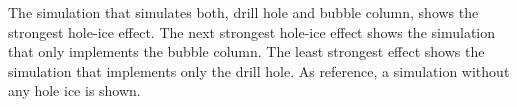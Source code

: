 The simulation that simulates both, drill hole and bubble column, shows the strongest hole-ice effect. The next strongest hole-ice effect shows the simulation that only implements the bubble column. The least strongest effect shows the simulation that implements only the drill hole. As reference, a simulation without any hole ice is shown.
